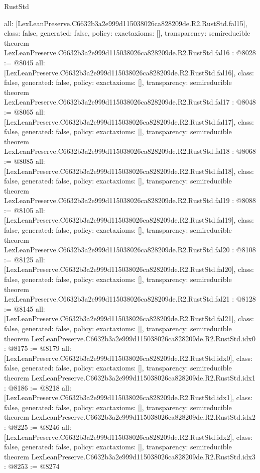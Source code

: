 \begin{lexlean}{RustStd}
\begin{coremodule}
{  all: [LexLeanPreserve.C6632b3a2e999d115038026ca828209de.R2.RustStd.fal15],
  class: false,
  generated: false,
  policy: exact{axioms: []},
  transparency: semireducible
}
theorem LexLeanPreserve.C6632b3a2e999d115038026ca828209de.R2.RustStd.fal16 : @8028 := @8045 {
  all: [LexLeanPreserve.C6632b3a2e999d115038026ca828209de.R2.RustStd.fal16],
  class: false,
  generated: false,
  policy: exact{axioms: []},
  transparency: semireducible
}
theorem LexLeanPreserve.C6632b3a2e999d115038026ca828209de.R2.RustStd.fal17 : @8048 := @8065 {
  all: [LexLeanPreserve.C6632b3a2e999d115038026ca828209de.R2.RustStd.fal17],
  class: false,
  generated: false,
  policy: exact{axioms: []},
  transparency: semireducible
}
theorem LexLeanPreserve.C6632b3a2e999d115038026ca828209de.R2.RustStd.fal18 : @8068 := @8085 {
  all: [LexLeanPreserve.C6632b3a2e999d115038026ca828209de.R2.RustStd.fal18],
  class: false,
  generated: false,
  policy: exact{axioms: []},
  transparency: semireducible
}
theorem LexLeanPreserve.C6632b3a2e999d115038026ca828209de.R2.RustStd.fal19 : @8088 := @8105 {
  all: [LexLeanPreserve.C6632b3a2e999d115038026ca828209de.R2.RustStd.fal19],
  class: false,
  generated: false,
  policy: exact{axioms: []},
  transparency: semireducible
}
theorem LexLeanPreserve.C6632b3a2e999d115038026ca828209de.R2.RustStd.fal20 : @8108 := @8125 {
  all: [LexLeanPreserve.C6632b3a2e999d115038026ca828209de.R2.RustStd.fal20],
  class: false,
  generated: false,
  policy: exact{axioms: []},
  transparency: semireducible
}
theorem LexLeanPreserve.C6632b3a2e999d115038026ca828209de.R2.RustStd.fal21 : @8128 := @8145 {
  all: [LexLeanPreserve.C6632b3a2e999d115038026ca828209de.R2.RustStd.fal21],
  class: false,
  generated: false,
  policy: exact{axioms: []},
  transparency: semireducible
}
theorem LexLeanPreserve.C6632b3a2e999d115038026ca828209de.R2.RustStd.idx0 : @8175 := @8179 {
  all: [LexLeanPreserve.C6632b3a2e999d115038026ca828209de.R2.RustStd.idx0],
  class: false,
  generated: false,
  policy: exact{axioms: []},
  transparency: semireducible
}
theorem LexLeanPreserve.C6632b3a2e999d115038026ca828209de.R2.RustStd.idx1 : @8186 := @8218 {
  all: [LexLeanPreserve.C6632b3a2e999d115038026ca828209de.R2.RustStd.idx1],
  class: false,
  generated: false,
  policy: exact{axioms: []},
  transparency: semireducible
}
theorem LexLeanPreserve.C6632b3a2e999d115038026ca828209de.R2.RustStd.idx2 : @8225 := @8246 {
  all: [LexLeanPreserve.C6632b3a2e999d115038026ca828209de.R2.RustStd.idx2],
  class: false,
  generated: false,
  policy: exact{axioms: []},
  transparency: semireducible
}
theorem LexLeanPreserve.C6632b3a2e999d115038026ca828209de.R2.RustStd.idx3 : @8253 := @8274 {
}
\end{coremodule}
\end{lexlean}
